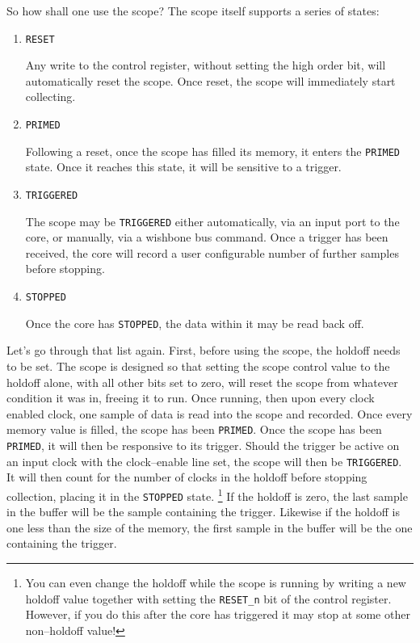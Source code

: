 \documentclass{gqtekspec}
\begin{document}
So how shall one use the scope?  The scope itself supports a series of
states:
\begin{enumerate}
\item {\tt RESET}

	Any write to the control register, without setting the high order bit,
	will automatically reset the scope.  Once reset, the scope will
	immediately start collecting.
\item {\tt PRIMED}

	Following a reset, once the scope has filled its memory, it enters the
	{\tt PRIMED} state.  Once it reaches this state, it will be sensitive
	to a trigger.
\item {\tt TRIGGERED}

    The scope may be {\tt TRIGGERED} either automatically, via an input port to
    the core, or manually, via a wishbone bus command.  Once a trigger
    has been received, the core will record a user configurable number of
    further samples before stopping.

\item {\tt STOPPED}

    Once the core has {\tt STOPPED}, the data within it may be read back off.
\end{enumerate}

Let's go through that list again.  First, before using the scope, the holdoff
needs to be set.  The scope is designed so that setting the scope control value
to the holdoff alone, with all other bits set to zero, will reset the scope
from whatever condition it was in,
freeing it to run.  Once running, then upon every clock enabled clock, one
sample of data is read into the scope and recorded.  Once every memory value
is filled, the scope has been {\tt PRIMED}.  Once the scope has been
{\tt PRIMED}, it will then be responsive to its trigger.  Should the trigger be
active on an input clock with the clock--enable line set, the scope will then
be {\tt TRIGGERED}.  It
will then count for the number of clocks in the holdoff before stopping 
collection, placing it in the {\tt STOPPED} state.  \footnote{You can even
change the holdoff while the scope is running by writing a new holdoff value
together with setting the {\tt RESET\_n} bit of the control register.  However,
if you do this after the core has triggered it may stop at some other
non--holdoff value!}  If the holdoff is zero, the last sample in the buffer
will be the sample containing the trigger.  Likewise if the holdoff is one
less than the size of the memory, the first sample in the buffer will be the
one containing the trigger.
 
\end{document}
